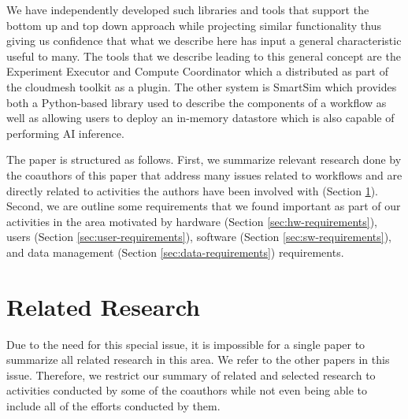 \documentclass[utf8]{FrontiersinVancouver} %
\newcommand{\TODO}[1]{\todo[inline]{#1}}
\begin{document}
We have independently developed such libraries and tools that support the bottom up and top down approach while projecting similar functionality thus giving us confidence that what we describe here has input a general characteristic useful to many.
The tools that we describe leading to this general concept are the Experiment Executor and Compute Coordinator which a distributed as part of the cloudmesh toolkit as a plugin. The other system is SmartSim which provides both a Python-based library used to describe the components of a workflow as well as allowing users to deploy an in-memory datastore which is also capable of performing AI inference. 

The paper is structured as follows. First, we summarize relevant research done by the coauthors of this paper that address many issues related to workflows and are directly related to activities the authors have been involved with (Section \ref{sec:related}).
Second, we are outline some requirements that we found important as part of our activities in the area motivated by hardware (Section \ref{sec:hw-requirements}), users (Section \ref{sec:user-requirements}), software (Section \ref{sec:sw-requirements}), and data management (Section \ref{sec:data-requirements}) requirements.

\TODO{complete structure of paper}



\section{Related Research}
\label{sec:related}

Due to the need for this special issue, it is impossible for a single paper to summarize all related research in this area. We refer to the other papers in this issue. Therefore, we restrict our summary of related and selected research to activities conducted by some of the coauthors while not even being able to include all of the efforts conducted by them.
\end{document}
